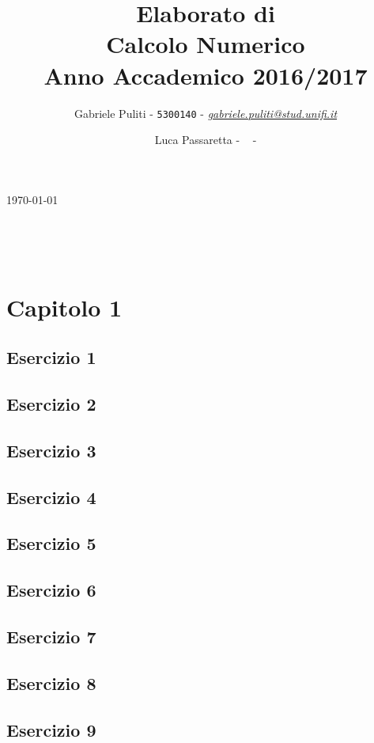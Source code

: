 \documentclass[11pt]{extarticle}
\title{\vspace{2cm}Elaborato di\\ \textbf{Calcolo Numerico}\\ Anno Accademico 2016/2017\vspace{1cm}}
\author{Gabriele Puliti - \texttt{5300140} - \href{mailto:gabriele.puliti@stud.unifi.it}{\textit{gabriele.puliti@stud.unifi.it}}
\and Luca Passaretta - \texttt{ } - \href{mailto: }{\textit{ }}}
\date{}
\begin{document}
\maketitle

\begin{center}
\today{}
\end{center}

\
\newpage

\tableofcontents
\
\newpage

\section{\textbf{Capitolo 1}}
\subsection{Esercizio 1}

\subsection{Esercizio 2}

\subsection{Esercizio 3}

\subsection{Esercizio 4}

\subsection{Esercizio 5}

\subsection{Esercizio 6}

\subsection{Esercizio 7}

\subsection{Esercizio 8}

\subsection{Esercizio 9}

\end{document}
